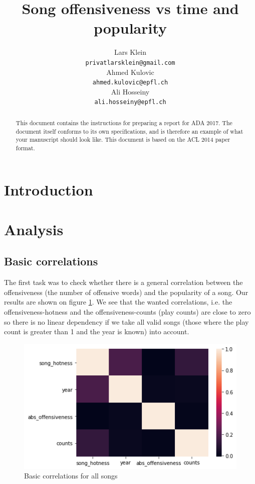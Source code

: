 \documentclass[11pt]{article}
\title{Song offensiveness vs time and popularity}
\author{Lars Klein \\
  {\tt privatlarsklein@gmail.com} \\\And
  Ahmed Kulovic \\
  {\tt ahmed.kulovic@epfl.ch} \\\And
Ali Hosseiny \\
{\tt ali.hosseiny@epfl.ch} \\}
\date{}
\begin{document}
\maketitle
\begin{abstract}
  This document contains the instructions for preparing a report for ADA 2017. The document itself conforms to its own specifications, and is therefore an example of
  what your manuscript should look like. This document is based on the ACL 2014 paper format.
\end{abstract}



\section{Introduction}

\section{Analysis}

\subsection{Basic correlations}

The first task was to check whether there is a general correlation between the offensiveness (the number of offensive words) and the popularity of a song. Our results are shown on figure \ref{basic_correlations}. We see that the wanted correlations, i.e. the offensiveness-hotness and the offensiveness-counts (play counts) are close to zero so there is no linear dependency if we take all valid songs (those where the play count is greater than 1 and the year is known) into account.

\begin{figure}

\includegraphics{plots/basic_correlations}
\caption{Basic correlations for all songs}
\label{basic_correlations}
\end{figure}
\end{document}
